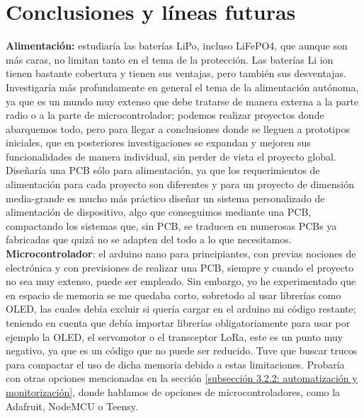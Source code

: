 \documentclass[12pt]{article}
\begin{document}
	\pagebreak
	
	\section[Conclusiones y líneas futuras]{Conclusiones y líneas futuras}
	
	\noindent \textbf{Alimentación:} estudiaría las baterías LiPo, incluso LiFePO4, que aunque son más caras, no limitan tanto en el tema de la protección. Las baterías Li ion tienen bastante cobertura y tienen sus ventajas, pero también sus desventajas. Investigaría más profundamente en general el tema de la alimentación autónoma, ya que es un mundo muy extenso que debe tratarse de manera externa a la parte radio o a la parte de microcontrolador; podemos realizar proyectos donde abarquemos todo, pero para llegar a conclusiones donde se lleguen a prototipos iniciales, que en posteriores investigaciones se expandan y mejoren sus funcionalidades de manera individual, sin perder de vista el proyecto global. Diseñaría una PCB sólo para alimentación, ya que los requerimientos de alimentación para cada proyecto son diferentes y para un proyecto de dimensión media-grande es mucho más práctico diseñar un sistema personalizado de alimentación de dispositivo, algo que conseguimos mediante una PCB, compactando los sistemas que, sin PCB, se traducen en numerosas PCBs ya fabricadas que quizá no se adapten del todo a lo que necesitamos. \\
	
	\noindent \textbf{Microcontrolador}: el arduino nano para principiantes, con previas nociones de electrónica y con previsiones de realizar una PCB, siempre y cuando el proyecto no sea muy extenso, puede ser empleado. Sin embargo, yo he experimentado que en espacio de memoria se me quedaba corto, sobretodo al usar librerías como OLED, las cuales debía excluir si quería cargar en el arduino mi código restante; teniendo en cuenta que debía importar librerías obligatoriamente para usar por ejemplo la OLED, el servomotor o el transceptor LoRa, este es un punto muy negativo, ya que es un código que no puede ser reducido. Tuve que buscar trucos para compactar el uso de dicha memoria debido a estas limitaciones. Probaría con otras opciones mencionadas en la sección \ref{subsección 3.2.2: automatización y monitorización}, donde hablamos de opciones de microcontroladores, como la Adafruit, NodeMCU o Teensy. \\
	
	\pagebreak
	
\end{document}

